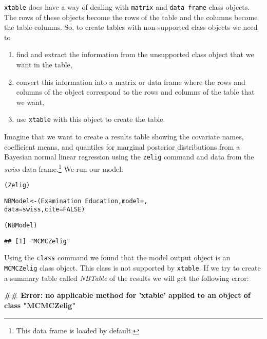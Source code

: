 {\tt{xtable}} does have a way of dealing with {\tt{matrix}} and {\tt{data frame}} class objects. The rows of these objects become the rows of the table and the columns become the table columns. So, to create tables with non-supported class objects we need to

\begin{enumerate}
    \item find and extract the information from the unsupported class object that we want in the table, 
    \item convert this information into a matrix or data frame where the rows and columns of the object correspond to the rows and columns of the table that we want,
    \item use {\tt{xtable}} with this object to create the table.
\end{enumerate}

Imagine that we want to create a results table showing the covariate names, coefficient means, and quantiles for marginal posterior distributions from a Bayesian normal linear regression using the {\tt{zelig}} command \cite{Goodrich2007} and data from the {\emph{swiss}} data frame.\footnote{This data frame is loaded by default.} We run our model:

\begin{knitrout}
\color{fgcolor}\begin{kframe}
\begin{alltt}
(Zelig)

NBModel <- (Examination ~ Education, model = , 
                    data = swiss, cite = FALSE)

(NBModel)
\end{alltt}
\begin{verbatim}
## [1] "MCMCZelig"
\end{verbatim}
\end{kframe}
\end{knitrout}


Using the {\tt{class}} command we found that the model output object is an {\tt{MCMCZelig}} class object. This class is not supported by {\tt{xtable}}. If we try to create a summary table called {\emph{NBTable}} of the results we will get the following error:

\begin{knitrout}
\color{fgcolor}\begin{kframe}


{\ttfamily\noindent\bfseries\textcolor{errorcolor}{\#\# Error: no applicable method for 'xtable' applied to an object of class "MCMCZelig"}}\end{kframe}
\end{knitrout}


